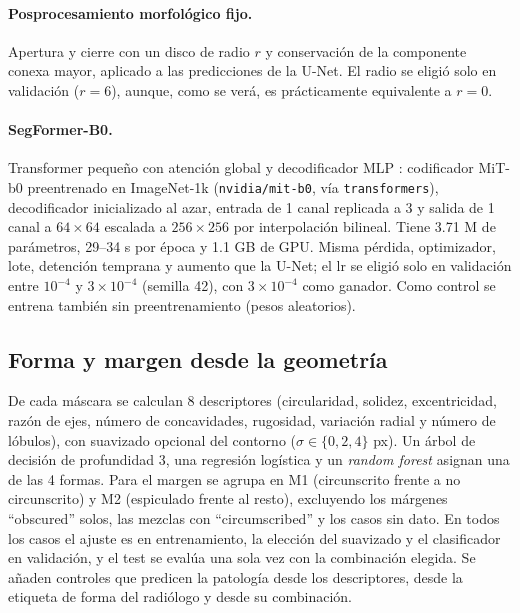 \documentclass[11pt,a4paper]{article}
\begin{document}
\paragraph{Posprocesamiento morfológico fijo.} Apertura y cierre con un disco de radio $r$ y conservación de la componente conexa mayor, aplicado a las predicciones de la U-Net. El radio se eligió solo en validación ($r=6$), aunque, como se verá, es prácticamente equivalente a $r=0$.

\paragraph{SegFormer-B0.} Transformer pequeño con atención global y decodificador MLP \citep{xie2021segformer}: codificador MiT-b0 preentrenado en ImageNet-1k (\texttt{nvidia/mit-b0}, vía \texttt{transformers}), decodificador inicializado al azar, entrada de 1 canal replicada a 3 y salida de 1 canal a $64\times64$ escalada a $256\times256$ por interpolación bilineal. Tiene 3.71 M de parámetros, 29--34 s por época y 1.1 GB de GPU. Misma pérdida, optimizador, lote, detención temprana y aumento que la U-Net; el lr se eligió solo en validación entre $10^{-4}$ y $3\times10^{-4}$ (semilla 42), con $3\times10^{-4}$ como ganador. Como control se entrena también sin preentrenamiento (pesos aleatorios).

\subsection{Forma y margen desde la geometría}
De cada máscara se calculan 8 descriptores (circularidad, solidez, excentricidad, razón de ejes, número de concavidades, rugosidad, variación radial y número de lóbulos), con suavizado opcional del contorno ($\sigma\in\{0,2,4\}$ px). Un árbol de decisión de profundidad 3, una regresión logística y un \emph{random forest} \citep{pedregosa2011sklearn,vanderwalt2014skimage} asignan una de las 4 formas. Para el margen se agrupa en M1 (circunscrito frente a no circunscrito) y M2 (espiculado frente al resto), excluyendo los márgenes ``obscured'' solos, las mezclas con ``circumscribed'' y los casos sin dato. En todos los casos el ajuste es en entrenamiento, la elección del suavizado y el clasificador en validación, y el test se evalúa una sola vez con la combinación elegida. Se añaden controles que predicen la patología desde los descriptores, desde la etiqueta de forma del radiólogo y desde su combinación.
\end{document}
